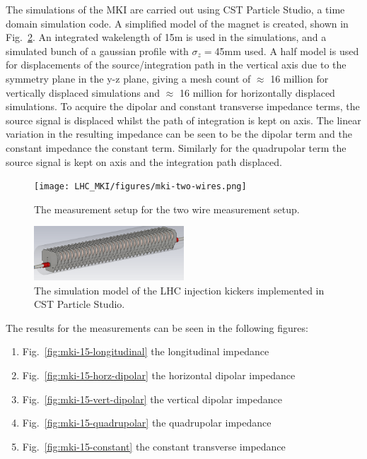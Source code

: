 The simulations of the MKI are carried out using CST Particle Studio, a time domain simulation code. A simplified model of the magnet is created, shown in Fig.~\ref{fig:mki-simulation-model}. An integrated wakelength of 15m is used in the simulations, and a simulated bunch of a gaussian profile with $\sigma_{z}=$45mm used. A half model is used for displacements of the source/integration path in the vertical axis due to the symmetry plane in the y-z plane, giving a mesh count of $\approx$ 16 million for vertically displaced simulations and $\approx$ 16 million for horizontally displaced simulations. To acquire the dipolar and constant transverse impedance terms, the source signal is displaced whilst the path of integration is kept on axis. The linear variation in the resulting impedance can be seen to be the dipolar term and the constant impedance the constant term. Similarly for the quadrupolar term the source signal is kept on axis and the integration path displaced.

\begin{figure}
\begin{center}
\texttt{[image: LHC\_MKI/figures/mki-two-wires.png]}
\end{center}
\caption{The measurement setup for the two wire measurement setup.}
\label{fig:mki-meas-two-wire}
\end{figure}

\begin{figure}
\begin{center}
\includegraphics[width=0.5\textwidth]{LHC_MKI/figures/simulation-model-mki-15.png}
\end{center}
\caption{The simulation model of the LHC injection kickers implemented in CST Particle Studio.}
\label{fig:mki-simulation-model}
\end{figure}


The results for the measurements can be seen in the following figures:
\begin{enumerate}
\item{Fig.~\ref{fig:mki-15-longitudinal} the longitudinal impedance}
\item{Fig.~\ref{fig:mki-15-horz-dipolar} the horizontal dipolar impedance}
\item{Fig.~\ref{fig:mki-15-vert-dipolar} the vertical dipolar impedance}
\item{Fig.~\ref{fig:mki-15-quadrupolar} the quadrupolar impedance}
\item{Fig.~\ref{fig:mki-15-constant} the constant transverse impedance}
\end{enumerate}

